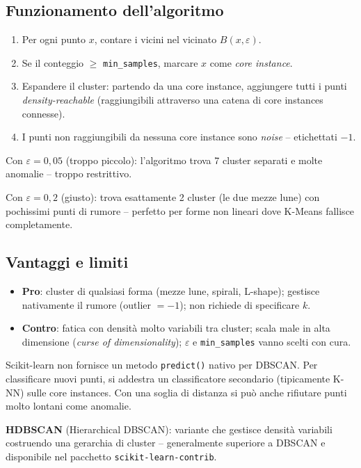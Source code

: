\subsection{Funzionamento dell'algoritmo}

\begin{enumerate}
    \item Per ogni punto $x$, contare i vicini nel vicinato $B(x, \varepsilon)$.
    \item Se il conteggio $\geq$ \texttt{min\_samples}, marcare $x$ come \emph{core instance}.
    \item Espandere il cluster: partendo da una core instance, aggiungere tutti i punti \emph{density-reachable} (raggiungibili attraverso una catena di core instances connesse).
    \item I punti non raggiungibili da nessuna core instance sono \emph{noise} -- etichettati $-1$.
\end{enumerate}

\begin{exbox}
Con $\varepsilon = 0{,}05$ (troppo piccolo): l'algoritmo trova 7 cluster separati e molte anomalie -- troppo restrittivo.

Con $\varepsilon = 0{,}2$ (giusto): trova esattamente 2 cluster (le due mezze lune) con pochissimi punti di rumore -- perfetto per forme non lineari dove K-Means fallisce completamente.
\end{exbox}

\subsection{Vantaggi e limiti}

\begin{itemize}
    \item \textbf{Pro}: cluster di qualsiasi forma (mezze lune, spirali, L-shape); gestisce nativamente il rumore (outlier $= -1$); non richiede di specificare $k$.
    \item \textbf{Contro}: fatica con densità molto variabili tra cluster; scala male in alta dimensione (\emph{curse of dimensionality}); $\varepsilon$ e \texttt{min\_samples} vanno scelti con cura.
\end{itemize}

\begin{notebox}
Scikit-learn non fornisce un metodo \texttt{predict()} nativo per DBSCAN. Per classificare nuovi punti, si addestra un classificatore secondario (tipicamente K-NN) sulle core instances. Con una soglia di distanza si può anche rifiutare punti molto lontani come anomalie.

\textbf{HDBSCAN} (Hierarchical DBSCAN): variante che gestisce densità variabili costruendo una gerarchia di cluster -- generalmente superiore a DBSCAN e disponibile nel pacchetto \texttt{scikit-learn-contrib}.
\end{notebox}

